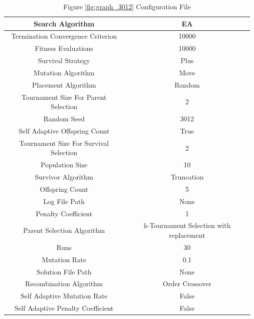 \documentclass{standalone}
\begin{document}
\begin{table}[!htb]
	\centering
	\caption{Figure \ref{fig:graph_3012} Configuration File}
	\label{tab:graph_3012}
	\begin{tabular}{| c | c |}
		\hline
		Search Algorithm		& EA		 \\
		\hline
		Termination Convergence Criterion		& 10000		 \\
		\hline
		Fitness Evaluations		& 10000		 \\
		\hline
		Survival Strategy		& Plus		 \\
		\hline
		Mutation Algorithm		& Move		 \\
		\hline
		Placement Algorithm		& Random		 \\
		\hline
		Tournament Size For Parent Selection		& 2		 \\
		\hline
		Random Seed		& 3012		 \\
		\hline
		Self Adaptive Offspring Count		& True		 \\
		\hline
		Tournament Size For Survival Selection		& 2		 \\
		\hline
		Population Size		& 10		 \\
		\hline
		Survivor Algorithm		& Truncation		 \\
		\hline
		Offspring Count		& 5		 \\
		\hline
		Log File Path		& None		 \\
		\hline
		Penalty Coefficient		& 1		 \\
		\hline
		Parent Selection Algorithm		& k-Tournament Selection with replacement		 \\
		\hline
		Runs		& 30		 \\
		\hline
		Mutation Rate		& 0.1		 \\
		\hline
		Solution File Path		& None		 \\
		\hline
		Recombination Algorithm		& Order Crossover		 \\
		\hline
		Self Adaptive Mutation Rate		& False		 \\
		\hline
		Self Adaptive Penalty Coefficient		& False		 \\
		\hline
	\end{tabular}
\end{table}
\end{document}
